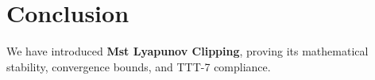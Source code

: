 \section{Conclusion}
We have introduced \textbf{Mst Lyapunov Clipping}, proving its mathematical stability, convergence bounds, and TTT-7 compliance.
